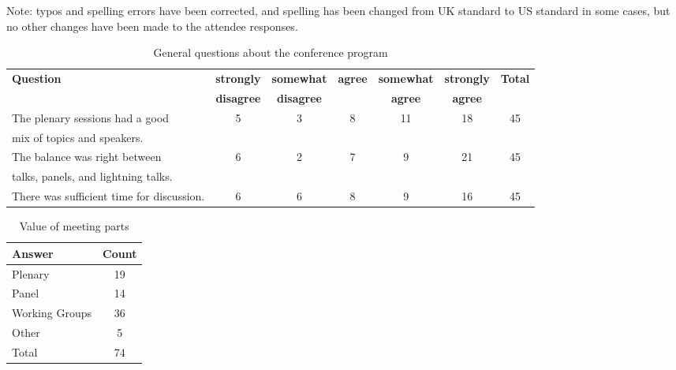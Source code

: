 Note: typos and spelling errors have been corrected, and spelling has been changed from UK standard to US standard in some cases, but no other changes have been made to the attendee responses.



\begin{table}[h!]
\centering
\caption{General questions about the conference program}
\label{tab:survey_program}
{\scriptsize
\begin{tabular}{|l|cccccc|}
\hline
{\bf Question} &
{\bf strongly} &
{\bf somewhat}  &
{\bf agree} &
{\bf somewhat}  &
{\bf strongly}  &
{\bf Total} \\
&
{\bf disagree} &
{\bf disagree} &
&
{\bf agree} &
{\bf agree} &
\\ \hline
The plenary sessions had a good&
5 &
3 &
8 &
11 &
18 &
45 \\
\hspace{.2cm}mix of topics and speakers. &
 &
 &
 &
 &
 &
 \\
The balance was right between  &
6 &
2 &
7 &
9 &
21 &
45 \\
\hspace{.2cm}talks, panels, and lightning talks. &
&
 &
 &
 &
 &
 \\
There was sufficient time for discussion. &
6 &
6 &
8 &
9 &
16 &
45 \\
\hline
\end{tabular}
}
\end{table}



\begin{table}[h!]
\centering
\caption{Value of meeting parts}
\label{tab:survey_parts}
\begin{tabular}{|l|c|}
\hline
{\bf Answer} &
{\bf Count} \\ \hline
Plenary &
19 \\
Panel &
14 \\
Working Groups &
36 \\
Other &
5 \\
Total &
74 \\
\hline
\end{tabular}
\end{table}



